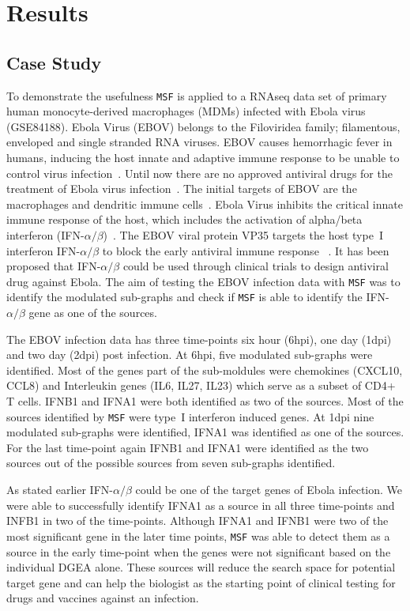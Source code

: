 \documentclass[twocolumn]{article}
\begin{document}
\section*{Results}

\subsection*{Case Study}

To demonstrate the usefulness \texttt{MSF} is applied to a RNAseq data
set of primary human monocyte-derived macrophages (MDMs) infected with
Ebola virus~\cite{Olejnik} (GSE84188). Ebola Virus (EBOV)
belongs to the Filoviridea family; filamentous, enveloped and single
stranded RNA viruses. EBOV causes hemorrhagic fever in humans,
inducing the host innate and adaptive immune response to be unable to
control virus infection~\cite{Prins}. Until now there are no approved
antiviral drugs for the treatment of Ebola virus infection~\cite{Konde,Rhein}. 
The initial targets of EBOV are the macrophages and
dendritic immune cells~\cite{Falasca,Rhein}. Ebola Virus inhibits the critical
innate immune response of the host, which includes the activation of
alpha/beta interferon (IFN-$\alpha /
\beta$)~\cite{Prins,Konde,Cardenas}. The EBOV viral protein VP35
targets the host type~I interferon IFN-$\alpha / \beta$ to block the
early antiviral immune response
~\cite{Prins,Konde,Falasca,Cardenas,Olejnik}. It has been proposed
that IFN-$\alpha / \beta$ could be used through clinical trials to
design antiviral drug against Ebola. The aim of testing the EBOV infection data with \texttt{MSF} was to  identify the modulated sub-graphs and check if \texttt{MSF} is able to identify the IFN-$\alpha / \beta$ gene as one of the sources.

The EBOV infection data has three time-points six hour (6hpi), one day (1dpi) and two day (2dpi) post infection. At 6hpi, five modulated sub-graphs were identified. Most of the genes part of the sub-moldules were chemokines (CXCL10, CCL8) and Interleukin genes (IL6, IL27, IL23) which serve as a subset of CD4+ T
cells. IFNB1  and IFNA1 were both identified as two of the sources. Most of the sources identified by \texttt{MSF} were type~I interferon induced genes. At 1dpi nine modulated sub-graphs were identified, IFNA1 was identified as one of the sources. For the last time-point again IFNB1 and IFNA1 were identified as the two sources out of the possible sources from seven sub-graphs identified.

As stated earlier IFN-$\alpha / \beta$ could be one of the target
genes of Ebola infection. We were able to successfully identify IFNA1
as a source in all three time-points and INFB1 in two of the time-points. Although IFNA1 and IFNB1 were two of the most
significant gene in the later time points, \texttt{MSF} was able to detect them as
a source in the early time-point when the genes were not significant
based on the individual DGEA alone. These sources will reduce the search space for potential target gene and can help the biologist as the starting point of clinical testing for drugs and vaccines against an infection.
\end{document}
